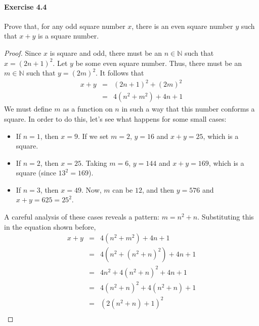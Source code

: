 \documentclass[a4paper,10pt]{article}
\newcommand{\Nat}{\ensuremath{\mathbb{N}}}
\begin{document}
\pagestyle{fancyplain}
\cfoot{- \thepage/\pageref{LastPage} -}
\renewcommand{\headrulewidth}{0pt}

\paragraph{Exercise 4.4}
Prove that, for any odd square number $x$, there is an even square number $y$
such that $x+y$ is a square number.\\

\begin{proof}
Since $x$ is square and odd, there must be an $n \in \Nat$ such that
$x = (2n+1)^2$. Let $y$ be some even square number. Thus, there must be an
$m \in \Nat$ such that $y = (2m)^2$. It follows that
\begin{eqnarray*}
x+y &=& (2n+1)^2 + (2m)^2 \\
    &=& 4(n^2 + m^2) + 4n + 1 
\end{eqnarray*}
We must define $m$ as a function on $n$ in such a way that this number conforms
a square. In order to do this, let's see what happens for some small cases:
\begin{itemize}
    \item If $n = 1$, then $x = 9$. If we set $m = 2$, $y = 16$ and $x+y = 25$,
    which is a square.
    \item If $n = 2$, then $x = 25$. Taking $m = 6$, $y = 144$ and $x+y = 169$,
    which is a square (since $13^2 = 169$).
    \item If $n = 3$, then $x = 49$. Now, $m$ can be $12$, and then $y = 576$
    and $x+y = 625 = 25^2$.
\end{itemize}
A careful analysis of these cases reveals a pattern: $m = n^2 + n$. Substituting
this in the equation shown before,
\begin{eqnarray*}
x+y &=& 4(n^2 + m^2) + 4n + 1  \\
    &=& 4(n^2 + (n^2 + n)^2) + 4n + 1 \\
    &=& 4n^2 + 4(n^2 + n)^2 + 4n + 1 \\
    &=& 4(n^2 + n)^2 + 4(n^2 + n) + 1 \\
    &=& (2(n^2 + n) + 1)^2 \\
\end{eqnarray*}
\end{proof}
\end{document}
